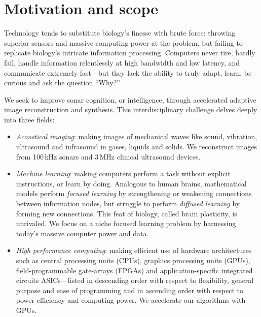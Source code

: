 \section{Motivation and scope}

Technology tends to substitute biology's finesse with brute force: throwing superior sensors and massive computing power at the problem, but failing to replicate biology's intricate information processing. Computers never tire, hardly fail, handle information relentlessly at high bandwidth and low latency, and communicate extremely fast---but they lack the ability to truly adapt, learn, be curious and ask the question ``Why?''


We seek to improve sonar cognition, or intelligence, through accelerated adaptive image reconstruction and synthesis. This  interdisciplinary challenge delves deeply into three fields:%
%
\begin{itemize}
%
\item \emph{Acoustical imaging}: making images of mechanical waves like sound, vibration, ultrasound and infrasound in gases, liquids and solids. We reconstruct images from 100\,kHz sonars and 3\,MHz clinical ultrasound devices. 
%
\item \emph{Machine learning}: making computers perform a task without explicit instructions, or learn by doing. Analogous to human brains, mathematical models perform \emph{focused learning} by strengthening or weakening connections between information nodes, but struggle to perform \emph{diffused learning} by forming new connections. This feat of biology, called brain plasticity, is unrivaled. We focus on a niche focused learning problem by harnessing today's massive computer power and data.
%
\item \emph{High performance computing}: making efficient use of hardware architectures such as central processing units (CPUs), graphics processing units (GPUs), field-programmable gate-arrays (FPGAs) and application-specific integrated circuits ASICs---listed in descending order with respect to flexibility, general purpose and ease of programming and in ascending order with respect to power efficiency and computing power. We accelerate our algorithms with GPUs.
\end{itemize}


